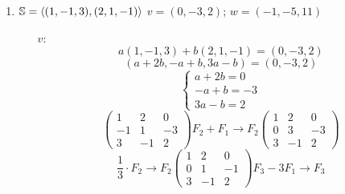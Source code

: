 \documentclass[../practica.root.tex]{subfiles}
\begin{document}
\begin{enumerate}
\begin{enumerate}
              \item $ \S = \langle (1,-1,3),(2,1,-1) \rangle $ \tabr $v = (0,-3,2)$; $w = (-1,-5,11)$
                    \begin{itemize}
                        \item[$v$:] \[ a(1, -1, 3) + b(2, 1, -1) = (0, -3, 2) \]
                              \[ (a + 2b, -a + b, 3a - b) = (0, -3, 2) \]
                              \[ \begin{cases}
                                      a + 2b = 0  \\
                                      -a + b = -3 \\
                                      3a - b = 2
                                  \end{cases}
                              \]\[
                                  \left(
                                  \begin{array}{cc|c}
                                          1  & 2   & 0  \\
                                          -1 & 1   & -3 \\
                                          3  & - 1 & 2
                                      \end{array}
                                  \right)
                                  F_2 + F_1 \to F_2
                                  \left(
                                  \begin{array}{cc|c}
                                          1 & 2  & 0  \\
                                          0 & 3  & -3 \\
                                          3 & -1 & 2
                                      \end{array}
                                  \right)
                              \] \[
                                  \frac{1}{3}\cdot F_2 \to F_2
                                  \left(
                                  \begin{array}{cc|c}
                                          1 & 2  & 0  \\
                                          0 & 1  & -1 \\
                                          3 & -1 & 2
                                      \end{array}
                                  \right)
                                  F_3 - 3F_1 \to F_3
\]
\end{itemize}
\end{enumerate}
\end{enumerate}
\end{document}
